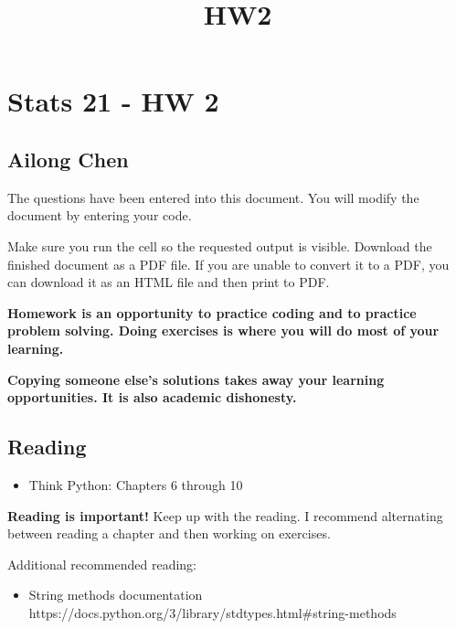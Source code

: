 \documentclass[11pt]{article}
\title{HW2}
\providecommand{\tightlist}{%
      \setlength{\itemsep}{0pt}\setlength{\parskip}{0pt}}
\begin{document}
    
    \maketitle
    
    

    
    \hypertarget{stats-21---hw-2}{%
\section{Stats 21 - HW 2}\label{stats-21---hw-2}}

    \hypertarget{ailong-chen}{%
\subsection{Ailong Chen}\label{ailong-chen}}

    The questions have been entered into this document. You will modify the
document by entering your code.

Make sure you run the cell so the requested output is visible. Download
the finished document as a PDF file. If you are unable to convert it to
a PDF, you can download it as an HTML file and then print to PDF.

\textbf{Homework is an opportunity to practice coding and to practice
problem solving. Doing exercises is where you will do most of your
learning.}

\textbf{Copying someone else's solutions takes away your learning
opportunities. It is also academic dishonesty.}

    \hypertarget{reading}{%
\subsection{Reading}\label{reading}}

\begin{itemize}
\tightlist
\item
  Think Python: Chapters 6 through 10
\end{itemize}

\textbf{Reading is important!} Keep up with the reading. I recommend
alternating between reading a chapter and then working on exercises.

Additional recommended reading:

\begin{itemize}
\tightlist
\item
  String methods documentation
  https://docs.python.org/3/library/stdtypes.html\#string-methods
\end{itemize}
\end{document}
